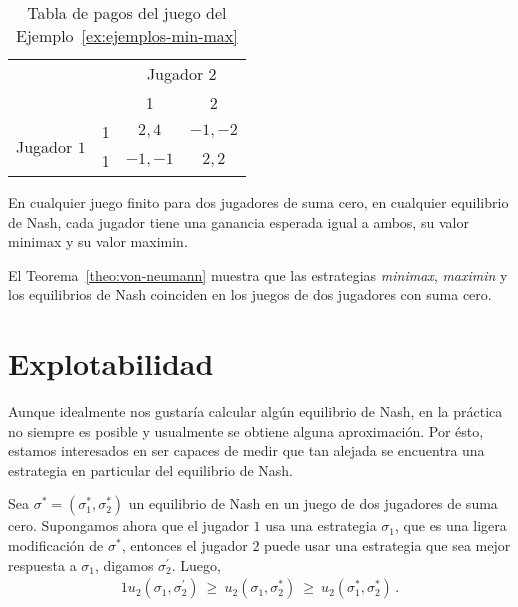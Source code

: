 \begin{table}
\begin{center}
\caption{Tabla de pagos del juego del Ejemplo~\ref{ex:ejemplos-min-max}}
\label{table:ejemplos-min-max}
\begin{tabular}{ c r | c | c |}
 & \multicolumn{1}{c}{} & \multicolumn{2}{c}{Jugador $2$} \\
 & \multicolumn{1}{c}{} & \multicolumn{1}{c}{1} & \multicolumn{1}{c}{2}  \\ \cline{3-4}
 \multirow{2}{*}{Jugador $1$}
 & 1 & $2, 4$ & $-1, -2$ \\ \cline{3-4}
 & 1 & $-1, -1$ & $2, 2$ \\ \cline{3-4}
\end{tabular}
\end{center}
\end{table}

\begin{theorem}
\label{theo:von-neumann}
En cualquier juego finito para dos jugadores de suma cero, en cualquier equilibrio de Nash, cada jugador tiene una ganancia esperada igual a ambos, su valor minimax y su valor maximin.  
\end{theorem}

El Teorema~\ref{theo:von-neumann} muestra que las estrategias \textit{minimax}, \textit{maximin} y los equilibrios de Nash coinciden en los juegos de dos jugadores con suma cero.

\section{Explotabilidad}
\label{section:explotabilidad}

Aunque idealmente nos gustaría calcular algún equilibrio de Nash, en la práctica no siempre es posible y usualmente se obtiene alguna aproximación. Por ésto, estamos interesados en ser capaces de medir que tan alejada se encuentra una estrategia en particular del equilibrio de Nash.

Sea $\sigma^* = (\sigma^*_1, \sigma^*_2)$ un equilibrio de Nash en un juego de dos jugadores de suma cero. Supongamos ahora que el jugador $1$  usa una estrategia $\sigma_1$, que es una ligera modificación de $\sigma^*$, entonces el jugador $2$ puede usar una estrategia que sea mejor respuesta a $\sigma_1$, digamos $\sigma^{\prime}_2$. Luego,
\begin{alignat}{1}
u_2(\sigma_1, \sigma^{\prime}_2)\ \geq\ u_2(\sigma_1, \sigma^*_2)\ \geq\ u_2(\sigma^*_1, \sigma^*_2) \,.
\end{alignat}

